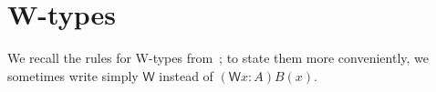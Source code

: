 \documentclass[10pt,a4paper,oneside,reqno]{amsart}
\numberwithin{equation}{section}
\theoremstyle{mythm}
\theoremstyle{mydef}
\theoremstyle{myrmk}
\newcommand{\W}{\mathsf{W}}
\newcommand{\wsup}{\mathsf{sup}}
\newcommand{\wind}{\mathsf{wind}}
\newcommand{\UU}{\mathsf{U}}
\begin{document}

\newpage
\section{W-types}
\label{section:wfiles}



We recall the rules for W-types from~\cite{MartinLofP:inttt}; to state them more conveniently, we sometimes write simply $\W$ instead of $(\W{x : A})B(x)$.
\end{document}
